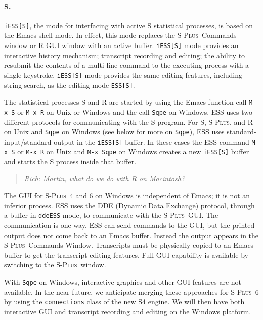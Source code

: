 \documentclass{article}
\newcommand*{\Splus}{\textsc{S-Plus}}
\newcommand{\stexttt}[1]{{\small\texttt{#1}}}
\newenvironment{Comment}{\begin{quote}\small\itshape }{\end{quote}}
\begin{document}
\paragraph{S.}
\label{sec:S:inf}

\stexttt{iESS[S]}, the mode for interfacing with active S statistical
processes, is based on the Emacs shell-mode.
In effect, this mode replaces the \Splus\ Commands
window or R GUI window with an active buffer.
\stexttt{iESS[S]} mode provides
an interactive history mechanism; transcript recording and editing; the
ability to resubmit the contents of a multi-line command to the
executing process with a single keystroke.  \stexttt{iESS[S]} mode
provides the same
editing features, including string-search, as the editing mode \stexttt{ESS[S]}.

The statistical processes S and R are started by using the Emacs
function call \stexttt{M-x~S} or \stexttt{M-x~R} on Unix or Windows and
the call \stexttt{Sqpe} on Windows.
ESS uses two different protocols for communicating with
the S program.  For S, \Splus, and R on Unix and \stexttt{Sqpe} on Windows
(see below for more on \stexttt{Sqpe}), ESS uses standard-input/standard-output
in the \stexttt{iESS[S]} buffer.
In these cases the ESS command \stexttt{M-x~S} or \stexttt{M-x~R} on Unix
and \stexttt{M-x~Sqpe} on Windows creates a new
\stexttt{iESS[S]} buffer and starts the S process inside that buffer.
\begin{Comment} Rich: Martin, what do we do with R on Macintosh?\end{Comment}

The GUI for \Splus\ 4 and 6 on Windows is independent of Emacs; it is not
an inferior process.
ESS uses the DDE (Dynamic Data Exchange) protocol,
through a buffer in \stexttt{ddeESS} mode, to communicate with
the \Splus\ GUI.
The communication is one-way.
ESS can send commands to the GUI, but the printed
output does not come back to an Emacs buffer.  Instead the output appears in
the \Splus\ Commands Window.  Transcripts must be physically copied to
an Emacs buffer to get the transcript editing features.  Full GUI
capability is available by switching to the \Splus\ window.

With \stexttt{Sqpe} on Windows,
interactive graphics and other GUI features are not available.  In the
near future, we anticipate merging these approaches for \Splus\ 6 by
using the \stexttt{connections} class of the new S4 engine.  We will
then have both interactive GUI and transcript recording and editing on
the Windows platform.
\end{document}
